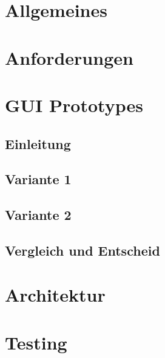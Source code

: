 \documentclass[10pt,a4paper,twoside]{article}
\begin{document}


\setcounter{tocdepth}{5} %
\setcounter{secnumdepth}{5} %
\tableofcontents
\newpage 
\section{Allgemeines}

\section{Anforderungen}

\section{GUI Prototypes}
\subsection{Einleitung}

\subsection{Variante 1}

\newpage
\subsection{Variante 2}

\newpage
\subsection{Vergleich und Entscheid}

\newpage
\section{Architektur}

\newpage
\section{Testing}

\newpage
\appendix
\listoffigures
\listoftables

\newpage
\renewcommand{\refname}{Quellenverzeichnis} 


\end{document}
